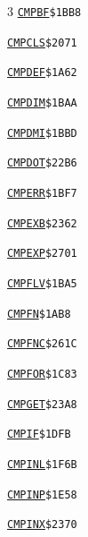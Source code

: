 \begin{multicols}{3}
\noindent\hyperlink{l:CMPBF}{\texttt{CMPBF}}\hfill\texttt{\$1BB8~\phantom{000}\llap{\pageref{l:CMPBF}}}\par
\noindent\hyperlink{l:CMPCLS}{\texttt{CMPCLS}}\hfill\texttt{\$2071~\phantom{000}\llap{\pageref{l:CMPCLS}}}\par
\noindent\hyperlink{l:CMPDEF}{\texttt{CMPDEF}}\hfill\texttt{\$1A62~\phantom{000}\llap{\pageref{l:CMPDEF}}}\par
\noindent\hyperlink{l:CMPDIM}{\texttt{CMPDIM}}\hfill\texttt{\$1BAA~\phantom{000}\llap{\pageref{l:CMPDIM}}}\par
\noindent\hyperlink{l:CMPDMI}{\texttt{CMPDMI}}\hfill\texttt{\$1BBD~\phantom{000}\llap{\pageref{l:CMPDMI}}}\par
\noindent\hyperlink{l:CMPDOT}{\texttt{CMPDOT}}\hfill\texttt{\$22B6~\phantom{000}\llap{\pageref{l:CMPDOT}}}\par
\noindent\hyperlink{l:CMPERR}{\texttt{CMPERR}}\hfill\texttt{\$1BF7~\phantom{000}\llap{\pageref{l:CMPERR}}}\par
\noindent\hyperlink{l:CMPEXB}{\texttt{CMPEXB}}\hfill\texttt{\$2362~\phantom{000}\llap{\pageref{l:CMPEXB}}}\par
\noindent\hyperlink{l:CMPEXP}{\texttt{CMPEXP}}\hfill\texttt{\$2701~\phantom{000}\llap{\pageref{l:CMPEXP}}}\par
\noindent\hyperlink{l:CMPFLV}{\texttt{CMPFLV}}\hfill\texttt{\$1BA5~\phantom{000}\llap{\pageref{l:CMPFLV}}}\par
\noindent\hyperlink{l:CMPFN}{\texttt{CMPFN}}\hfill\texttt{\$1AB8~\phantom{000}\llap{\pageref{l:CMPFN}}}\par
\noindent\hyperlink{l:CMPFNC}{\texttt{CMPFNC}}\hfill\texttt{\$261C~\phantom{000}\llap{\pageref{l:CMPFNC}}}\par
\noindent\hyperlink{l:CMPFOR}{\texttt{CMPFOR}}\hfill\texttt{\$1C83~\phantom{000}\llap{\pageref{l:CMPFOR}}}\par
\noindent\hyperlink{l:CMPGET}{\texttt{CMPGET}}\hfill\texttt{\$23A8~\phantom{000}\llap{\pageref{l:CMPGET}}}\par
\noindent\hyperlink{l:CMPIF}{\texttt{CMPIF}}\hfill\texttt{\$1DFB~\phantom{000}\llap{\pageref{l:CMPIF}}}\par
\noindent\hyperlink{l:CMPINL}{\texttt{CMPINL}}\hfill\texttt{\$1F6B~\phantom{000}\llap{\pageref{l:CMPINL}}}\par
\noindent\hyperlink{l:CMPINP}{\texttt{CMPINP}}\hfill\texttt{\$1E58~\phantom{000}\llap{\pageref{l:CMPINP}}}\par
\noindent\hyperlink{l:CMPINX}{\texttt{CMPINX}}\hfill\texttt{\$2370~\phantom{000}\llap{\pageref{l:CMPINX}}}\par

\end{multicols}
